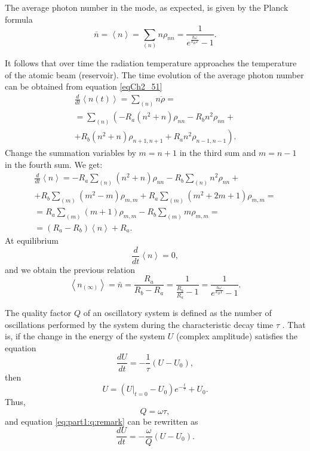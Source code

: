 The average photon number in the mode, as expected, is given by the Planck formula 
\begin{equation}
\bar{n} = \left<n\right> = 
\sum_{(n)} n \rho_{nn} = 
\frac{1}{ e^{\frac{\hbar \omega}{k_B T}} - 1}.
\end{equation}

It follows that over time the radiation temperature 
approaches the temperature of the atomic beam (reservoir).  
The time evolution of the average photon number can be obtained from equation 
\eqref{eqCh2_51}
\begin{eqnarray}
\frac{d}{d t}\left<n\left(t\right)\right> = \sum_{(n)}n \dot{\rho} = 
\nonumber \\
= \sum_{(n)}\left(-R_a\left(n^2 + n\right)\rho_{nn} - R_b n^2
\rho_{nn} + \right.
\nonumber \\
+ \left.
R_b \left(n^2 + n\right) \rho_{n +1, n+ 1} +
R_a n^2 \rho_{n - 1, n - 1}
\right).
\end{eqnarray}
Change the summation variables by $m= n + 1$ in the third sum and $m = n - 1$ in the fourth sum. We get:
\begin{eqnarray}
\frac{d}{d t}\left<n\right> = 
-R_a \sum_{(n)}\left(n^2 + n\right)\rho_{nn}
 - R_b \sum_{(n)} n^2 \rho_{nn} +
\nonumber \\
+ R_b\sum_{(m)}\left(m^2 - m\right)\rho_{m,m} 
+ R_a\sum_{(m)}\left(m^2 +2 m + 1\right)\rho_{m,m} = 
\nonumber \\
= R_a \sum_{(m)}\left( m + 1\right)\rho_{m,m} - R_b\sum_{(m)} m
\rho_{m,m} =
\nonumber \\
= \left(R_a - R_b\right) \left<n\right> + R_a.
\label{eqCh2_57}
\end{eqnarray}
At equilibrium
\[
\frac{d}{d t}\left<n\right> = 0,
\]  
and we obtain the previous relation
\begin{equation}
\left<n_{(\infty)}\right> = \bar{n} = 
\frac{R_a}{R_b - R_a} = \frac{1}{\frac{R_b}{R_a} - 1} = 
\frac{1}{e^{\frac{\hbar \omega}{k_B T}} - 1}.
\end{equation}

\begin{definition}
\label{def:Qfactor}
The quality factor $Q$ of an oscillatory system is defined as the number of oscillations 
performed by the system during the characteristic decay time $\tau$ \cite{bKarlov2003}. That is, if 
the change in the energy of the system $U$ (complex amplitude) satisfies the equation
\begin{equation}
\label{eq:part1:q:remark}
\frac{d U}{d t} = - \frac{1}{\tau} \left(U - U_0\right),
\end{equation}
then
\[
U = \left(\left.U\right|_{t=0} - U_0 \right)e^{-\frac{t}{\tau}} + U_0.
\]
Thus,
\[
Q = \omega \tau,
\]
and equation \eqref{eq:part1:q:remark} can be rewritten as
\[
\frac{d U}{d t} = - \frac{\omega}{Q} \left(U-U_0\right).
\]
\end{definition}


